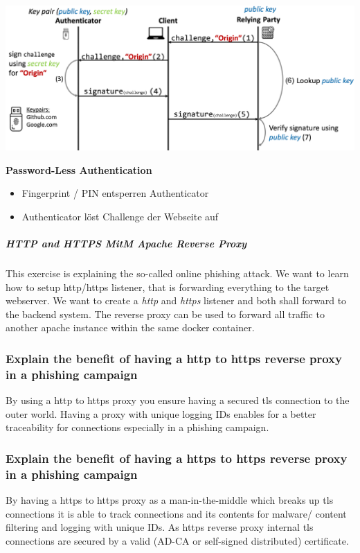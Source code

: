 \begin{center}
    \vspace{-8pt}
    \includegraphics[width=1.0\linewidth]{./img/09-mitm/fido2_proto}
    \vspace{-8pt}
\end{center}
\textbf{Password-Less Authentication}
\begin{itemize}
    \item Fingerprint / PIN entsperren Authenticator
    \item Authenticator löst Challenge der Webseite auf
\end{itemize}
\subparagraph{HTTP and HTTPS MitM Apache Reverse Proxy}
This exercise is explaining the so-called online phishing attack. We want to learn how to setup http/https listener, that is forwarding everything to the target webserver. We want to create a \textit{http} and \textit{https} listener and both shall forward to the backend system. The reverse proxy can be used to forward all traffic to another apache instance within the same docker container.
\subsubsection{Explain the benefit of having a http to https reverse proxy in a phishing campaign}
By using a http to https proxy you ensure having a secured tls connection to the outer world. Having a proxy with unique logging IDs enables for a better traceability for connections especially in a phishing campaign.
\subsubsection{Explain the benefit of having a https to https reverse proxy in a phishing campaign}
By having a https to https proxy as a man-in-the-middle which breaks up tls connections it is able to track connections and its contents for malware/ content filtering and logging with unique IDs. As https reverse proxy internal tls connections are secured by a valid (AD-CA or self-signed distributed) certificate.
